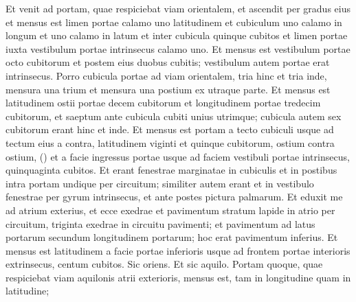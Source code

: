 \begin{biblechapter}
\begin{biblechapter}
\begin{biblechapter}
\begin{biblechapter}
\begin{biblechapter}
\begin{biblechapter}
\begin{biblechapter}
\begin{biblechapter}
\begin{biblechapter}
\begin{biblechapter}
\begin{biblechapter}
\begin{biblechapter}
\begin{biblechapter}
\begin{biblechapter}
\begin{biblechapter}
\begin{biblechapter}
\begin{biblechapter}
\begin{biblechapter}
\begin{biblechapter}
\begin{biblechapter}
\begin{biblechapter}
\begin{biblechapter}
\begin{biblechapter}
\begin{biblechapter}
\begin{biblechapter}
\begin{biblechapter}
\begin{biblechapter}
\begin{biblechapter}
\begin{biblechapter}
\begin{biblechapter}
\begin{biblechapter}
\begin{biblechapter}
\begin{biblechapter}
\begin{biblechapter}
\begin{biblechapter}
\begin{biblechapter}
\begin{biblechapter}
\begin{biblechapter}
\begin{biblechapter}
\begin{biblechapter}
 \verse Et venit ad portam, quae respiciebat viam orientalem, et ascendit per gradus eius et mensus est limen portae calamo uno latitudinem 
\verse et cubiculum uno calamo in longum et uno calamo in latum et inter cubicula quinque cubitos et limen portae iuxta vestibulum portae intrinsecus calamo uno. 
\verse Et mensus est vestibulum portae 
\verse octo cubitorum et postem eius duobus cubitis; vestibulum autem portae erat intrinsecus. 
\verse Porro cubicula portae ad viam orientalem, tria hinc et tria inde, mensura una trium et mensura una postium ex utraque parte. 
\verse Et mensus est latitudinem ostii portae decem cubitorum et longitudinem portae tredecim cubitorum, 
\verse et saeptum ante cubicula cubiti unius utrimque; cubicula autem sex cubitorum erant hinc et inde. 
\verse Et mensus est portam a tecto cubiculi usque ad tectum eius a contra, latitudinem viginti et quinque cubitorum, ostium contra ostium, 
(\verse) \verse et a facie ingressus portae usque ad faciem vestibuli portae intrinsecus, quinquaginta cubitos. 
\verse Et erant fenestrae marginatae in cubiculis et in postibus intra portam undique per circuitum; similiter autem erant et in vestibulo fenestrae per gyrum intrinsecus, et ante postes pictura palmarum.
 \verse Et eduxit me ad atrium exterius, et ecce exedrae et pavimentum stratum lapide in atrio per circuitum, triginta exedrae in circuitu pavimenti; 
\verse et pavimentum ad latus portarum secundum longitudinem portarum; hoc erat pavimentum inferius. 
\verse Et mensus est latitudinem a facie portae inferioris usque ad frontem portae interioris extrinsecus, centum cubitos. Sic oriens. Et sic aquilo.
 \verse Portam quoque, quae respiciebat viam aquilonis atrii exterioris, mensus est, tam in longitudine quam in latitudine; 

\end{biblechapter}
\end{biblechapter}
\end{biblechapter}
\end{biblechapter}
\end{biblechapter}
\end{biblechapter}
\end{biblechapter}
\end{biblechapter}
\end{biblechapter}
\end{biblechapter}
\end{biblechapter}
\end{biblechapter}
\end{biblechapter}
\end{biblechapter}
\end{biblechapter}
\end{biblechapter}
\end{biblechapter}
\end{biblechapter}
\end{biblechapter}
\end{biblechapter}
\end{biblechapter}
\end{biblechapter}
\end{biblechapter}
\end{biblechapter}
\end{biblechapter}
\end{biblechapter}
\end{biblechapter}
\end{biblechapter}
\end{biblechapter}
\end{biblechapter}
\end{biblechapter}
\end{biblechapter}
\end{biblechapter}
\end{biblechapter}
\end{biblechapter}
\end{biblechapter}
\end{biblechapter}
\end{biblechapter}
\end{biblechapter}
\end{biblechapter}
